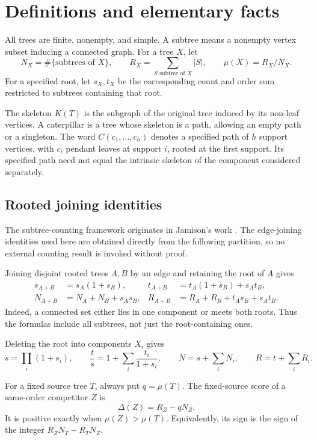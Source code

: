 \documentclass[11pt,reqno]{amsart}
\theoremstyle{plain}
\begin{document}
\section{Definitions and elementary facts}\label{definitions-and-elementary-facts}

All trees are finite, nonempty, and simple. A subtree means a nonempty vertex subset inducing a connected graph. For a tree \(X\), let \[
N_X=\#\{\text{subtrees of }X\},\qquad
R_X=\sum_{S\text{ subtree of }X}|S|,\qquad
\mu(X)=R_X/N_X.
\] For a specified root, let \(s_X,t_X\) be the corresponding count and order sum restricted to subtrees containing that root.

The skeleton \(K(T)\) is the subgraph of the original tree induced by its non-leaf vertices. A caterpillar is a tree whose skeleton is a path, allowing an empty path or a singleton. The word \(C(c_1,\ldots,c_h)\) denotes a specified path of \(h\) support vertices, with \(c_i\) pendant leaves at support \(i\), rooted at the first support. Its specified path need not equal the intrinsic skeleton of the component considered separately.

\subsection{Rooted joining identities}\label{rooted-joining-identities}
The subtree-counting framework originates in Jamison's work \cite{Jamison1983,Jamison1984}. The edge-joining identities used here are obtained directly from the following partition, so no external counting result is invoked without proof.


Joining disjoint rooted trees \(A,B\) by an edge and retaining the root of \(A\) gives \[
\begin{aligned}
s_{A+B}&=s_A(1+s_B),&
t_{A+B}&=t_A(1+s_B)+s_At_B,\\
N_{A+B}&=N_A+N_B+s_As_B,&
R_{A+B}&=R_A+R_B+t_As_B+s_At_B.
\end{aligned}
\tag{1.1}\label{eq:main-1-1}
\] Indeed, a connected set either lies in one component or meets both roots. Thus the formulas include all subtrees, not just the root-containing ones.

Deleting the root into components \(X_i\) gives \[
s=\prod_i(1+s_i),\qquad
\frac ts=1+\sum_i\frac{t_i}{1+s_i},\qquad
N=s+\sum_iN_i,\qquad R=t+\sum_iR_i.
\tag{1.2}\label{eq:main-1-2}
\]

For a fixed source tree \(T\), always put \(q=\mu(T)\). The fixed-source score of a same-order competitor \(Z\) is \[
\Delta(Z)=R_Z-qN_Z.
\tag{1.3}\label{eq:main-1-3}
\] It is positive exactly when \(\mu(Z)>\mu(T)\). Equivalently, its sign is the sign of the integer \(R_ZN_T-R_TN_Z\).
\end{document}
